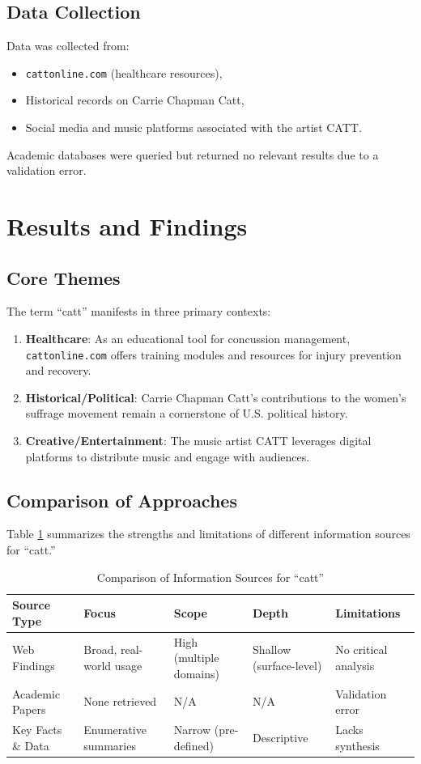 \documentclass{article}
\begin{document}
\subsection{Data Collection}
Data was collected from:
\begin{itemize}
    \item \texttt{cattonline.com} (healthcare resources),
    \item Historical records on Carrie Chapman Catt,
    \item Social media and music platforms associated with the artist CATT.
\end{itemize}
Academic databases were queried but returned no relevant results due to a validation error.

\section{Results and Findings}
\subsection{Core Themes}
The term ``catt'' manifests in three primary contexts:
\begin{enumerate}
    \item \textbf{Healthcare}: As an educational tool for concussion management, \texttt{cattonline.com} offers training modules and resources for injury prevention and recovery.
    \item \textbf{Historical/Political}: Carrie Chapman Catt's contributions to the women's suffrage movement remain a cornerstone of U.S. political history.
    \item \textbf{Creative/Entertainment}: The music artist CATT leverages digital platforms to distribute music and engage with audiences.
\end{enumerate}

\subsection{Comparison of Approaches}
Table \ref{tab:comparison} summarizes the strengths and limitations of different information sources for ``catt.''

\begin{table}[h]
\centering
\caption{Comparison of Information Sources for ``catt''}
\label{tab:comparison}
\begin{tabular}{l l l l l}
\toprule
\textbf{Source Type} & \textbf{Focus} & \textbf{Scope} & \textbf{Depth} & \textbf{Limitations} \\
\midrule
Web Findings & Broad, real-world usage & High (multiple domains) & Shallow (surface-level) & No critical analysis \\
Academic Papers & None retrieved & N/A & N/A & Validation error \\
Key Facts \& Data & Enumerative summaries & Narrow (pre-defined) & Descriptive & Lacks synthesis \\
\bottomrule
\end{tabular}
\end{table}
\end{document}
